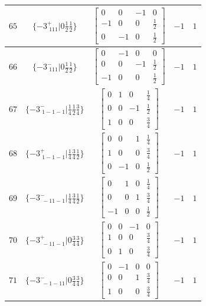 \documentclass[fleqn,8pt]{jsarticle}
\begin{document}
\begin{longtable}{ccccc}
$ 65 $ & $ \{-3^{+}_{\,\,111}|0 \frac{1}{2} \frac{1}{2}\} $ & $ \begin{bmatrix} 0 & 0 & -1 & 0 \\ -1 & 0 & 0 & \frac{1}{2} \\ 0 & -1 & 0 & \frac{1}{2} \end{bmatrix} $ & $ -1 $ & $ 1 $ \\ \hline
$ 66 $ & $ \{-3^{-}_{\,\,111}|0 \frac{1}{2} \frac{1}{2}\} $ & $ \begin{bmatrix} 0 & -1 & 0 & 0 \\ 0 & 0 & -1 & \frac{1}{2} \\ -1 & 0 & 0 & \frac{1}{2} \end{bmatrix} $ & $ -1 $ & $ 1 $ \\ \hline
$ 67 $ & $ \{-3^{-}_{\,\,1-1-1}|\frac{1}{4} \frac{1}{2} \frac{3}{4}\} $ & $ \begin{bmatrix} 0 & 1 & 0 & \frac{1}{4} \\ 0 & 0 & -1 & \frac{1}{2} \\ 1 & 0 & 0 & \frac{3}{4} \end{bmatrix} $ & $ -1 $ & $ 1 $ \\ \hline
$ 68 $ & $ \{-3^{+}_{\,\,1-1-1}|\frac{1}{4} \frac{3}{4} \frac{1}{2}\} $ & $ \begin{bmatrix} 0 & 0 & 1 & \frac{1}{4} \\ 1 & 0 & 0 & \frac{3}{4} \\ 0 & -1 & 0 & \frac{1}{2} \end{bmatrix} $ & $ -1 $ & $ 1 $ \\ \hline
$ 69 $ & $ \{-3^{-}_{\,\,-11-1}|\frac{1}{4} \frac{3}{4} \frac{1}{2}\} $ & $ \begin{bmatrix} 0 & 1 & 0 & \frac{1}{4} \\ 0 & 0 & 1 & \frac{3}{4} \\ -1 & 0 & 0 & \frac{1}{2} \end{bmatrix} $ & $ -1 $ & $ 1 $ \\ \hline
$ 70 $ & $ \{-3^{+}_{\,\,-11-1}|0 \frac{3}{4} \frac{3}{4}\} $ & $ \begin{bmatrix} 0 & 0 & -1 & 0 \\ 1 & 0 & 0 & \frac{3}{4} \\ 0 & 1 & 0 & \frac{3}{4} \end{bmatrix} $ & $ -1 $ & $ 1 $ \\ \hline
$ 71 $ & $ \{-3^{-}_{\,\,-1-11}|0 \frac{3}{4} \frac{3}{4}\} $ & $ \begin{bmatrix} 0 & -1 & 0 & 0 \\ 0 & 0 & 1 & \frac{3}{4} \\ 1 & 0 & 0 & \frac{3}{4} \end{bmatrix} $ & $ -1 $ & $ 1 $ \\ \hline

\end{longtable}
\end{document}

